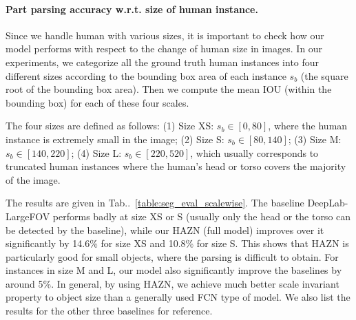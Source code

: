 \documentclass[runningheads]{llncs}
\makeatletter
\newcommand{\tabref}[1]{Tab\onedot~\ref{#1}}
\DeclareRobustCommand\onedot{\futurelet\@let@token\@onedot}
\def\@onedot{\ifx\@let@token.\else.\null\fi\xspace}
\makeatother
\begin{document}
\begin{table}[!b]
\centering
  \setlength{\tabcolsep}{10pt}
 \caption{Part parsing accuracy w.r.t. size of human instance (\%) on PASCAL-Person-Part in terms of mean IOU.}
\vspace{-1.\baselineskip}
\label{table:seg_eval_scalewise}
\end{table}  

\paragraph{Part parsing accuracy w.r.t. size of human instance.} Since we handle human with various sizes, it is important to check how our model performs with respect to the change of human size in images. 
In our experiments, we categorize all the ground truth human instances into four different sizes according to the bounding box area of each instance $s_b$ (the square root of the bounding box area). Then we compute the mean IOU (within the bounding box) for each of these four scales.

The four sizes are defined as follows: (1) Size XS: $s_b \in [0,80]$, where the human instance is extremely small in the image; (2) Size S: $s_b \in [80,140]$; (3) Size M: $s_b \in [140,220]$; (4) Size L: $s_b \in [220,520]$, which usually corresponds to truncated human instances where the human's head or torso covers the majority of the image. 

The results are given in \tabref{table:seg_eval_scalewise}. The baseline DeepLab-LargeFOV performs badly at size XS or S (usually only the head or the torso can be detected by the baseline), while our HAZN (full model) improves over it significantly by 14.6\% for size XS and 10.8\% for size S. This shows that HAZN is particularly good for small objects, where the parsing is difficult to obtain. For instances in size M and L, our model also significantly improve the baselines by around 5\%. In general, by using HAZN, we achieve much better scale invariant property to object size than a generally used FCN type of model. We also list the results for the other three baselines for reference. 
\end{document}
